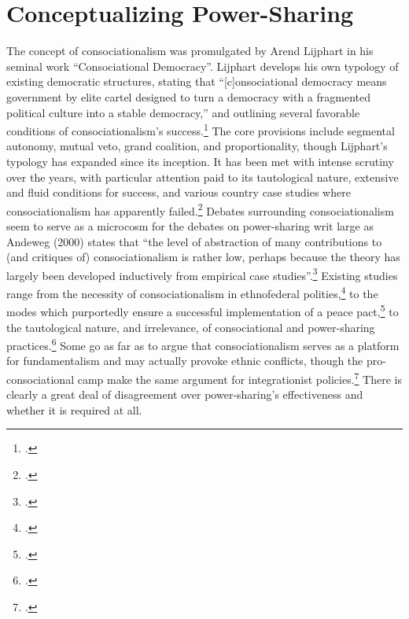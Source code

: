 \documentclass[12pt]{article}
\begin{document}
\section{Conceptualizing Power-Sharing} 
The concept of consociationalism was promulgated by Arend Lijphart in his seminal work ``Consociational Democracy''. Lijphart develops his own typology of existing democratic structures, stating that ``[c]onsociational democracy means government by elite cartel designed to turn a democracy with a fragmented political culture into a stable democracy,'' and outlining several favorable conditions of consociationalism’s success.\footcite[216]{lijphart_consociational_1969} The core provisions include segmental autonomy, mutual veto, grand coalition, and proportionality, though Lijphart's typology has expanded since its inception. It has been met with intense scrutiny over the years, with particular attention paid to its tautological nature, extensive and fluid conditions for success, and various country case studies where consociationalism has apparently failed.\footcite{andeweg_consociational_2000, bogaards_favourable_1998, seaver_regional_2000, tull_hidden_2005} Debates surrounding consociationalism seem to serve as a microcosm for the debates on power-sharing writ large as Andeweg (2000) states that ``the level of abstraction of many contributions to (and critiques of) consociationalism is rather low, perhaps because the theory has largely been developed inductively from empirical case studies''.\footcite[531]{andeweg_consociational_2000} Existing studies range from the necessity of consociationalism in ethnofederal polities,\footcite{lijphart_consociational_1969, lijphart_consociational_1977, oleary_debating_2005} to the modes which purportedly ensure a successful implementation of a peace pact,\footcite{walter_committing_2002, walter_explaining_2003, hartzell_institutionalizing_2003, hoddie_civil_2003, mukherjee_why_2006} to the tautological nature, and irrelevance, of consociational and power-sharing practices.\footcite{andeweg_consociational_2000, bogaards_favourable_1998, roeder_sustainable_2003} Some go as far as to argue that consociationalism serves as a platform for fundamentalism and may actually provoke ethnic conflicts, though the pro-consociational camp make the same argument for integrationist policies.\footcite{oleary_debating_2005} There is clearly a great deal of disagreement over power-sharing’s effectiveness and whether it is required at all. 
\end{document}
